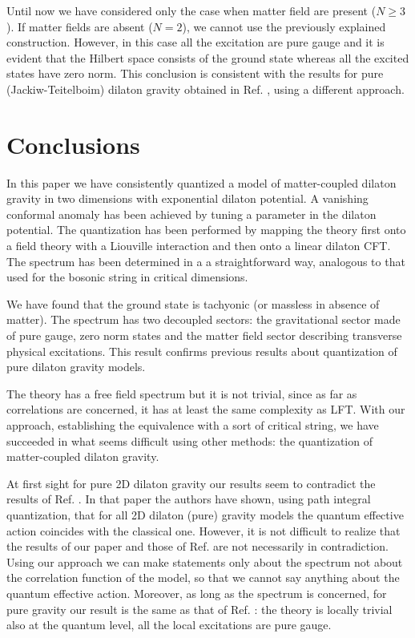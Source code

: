 \documentclass[a4paper,aps,prd,twocolumn,groupedaddress]{revtex4}
\begin{document}
Until now we have considered only the case when matter field are
present ($N\ge3$).  If matter fields are absent ($N=2$), we cannot use
the previously explained construction.  However, in this case all the
excitation are pure gauge and it is evident that the Hilbert space
consists of the ground state whereas all the excited states have zero
norm.  This conclusion is consistent with the results for pure
(Jackiw-Teitelboim) dilaton gravity obtained in Ref. \cite{jack}, using
a different approach.


\section{Conclusions}
In this paper we have consistently quantized a model of matter-coupled
dilaton gravity in two dimensions with exponential dilaton potential.
A vanishing conformal anomaly has been achieved by tuning a parameter
in the dilaton potential. The quantization has been performed by
mapping the theory first onto a field theory with a Liouville interaction
and then onto a linear dilaton CFT.  The spectrum has been determined
in a a straightforward way, analogous to that used for the bosonic
string in critical dimensions.

We have found that the ground state is tachyonic (or massless in
absence of matter). The spectrum has two decoupled sectors: the
gravitational sector made of pure gauge, zero norm states and the
matter field sector describing transverse physical excitations.  This
result confirms previous results \cite{jack} about quantization of
pure dilaton gravity models. 

The theory has a free field spectrum but it is not trivial, since as
far as correlations are concerned, it has at least the same complexity
as LFT. With our approach, establishing the equivalence with a sort of
critical string, we have  succeeded in what seems difficult
using other methods: the quantization of matter-coupled dilaton
gravity.

At first sight for pure 2D dilaton gravity 
our results seem to contradict the results of Ref. 
\cite{klw}. In that paper the authors have shown, using path integral 
quantization, that for all 2D dilaton (pure) gravity models the quantum 
effective action coincides with the classical one. 
However, it is not difficult to realize that the results of our paper 
and those of Ref. \cite{klw} are not necessarily in contradiction.
Using our approach we can make statements only about  the
spectrum not about the correlation function of the model, so that
we cannot say anything about 
the quantum effective action. 
Moreover, as  long as the spectrum is concerned, for pure gravity
our result is the same as that of Ref. \cite{klw}: the theory is 
locally trivial also at the quantum level, all the local excitations  
are pure gauge.
\end{document}
